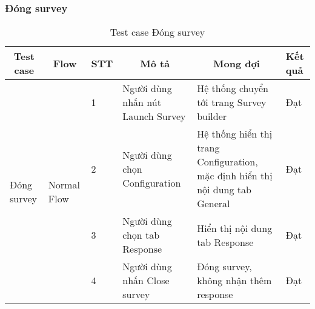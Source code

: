 \subsubsection{Đóng survey}
\begin{table}[H]
\begin{tabular}{|p{2cm}|p{2.5cm}|p{0.5cm}|p{4cm}|p{4cm}|p{1cm}|}
\hline
\multicolumn{1}{|c|}{\textbf{Test case}} & \multicolumn{1}{c|}{\textbf{Flow}} & \textbf{STT} & \multicolumn{1}{c|}{\textbf{Mô tả}} & \multicolumn{1}{c|}{\textbf{Mong đợi}} & \textbf{Kết quả} \\ \hline
\multirow{4}{*}{Đóng survey} & \multirow{4}{*}{Normal Flow} & 1 & Người dùng nhấn nút Launch Survey & Hệ thống chuyển tới trang Survey builder & Đạt \\ \cline{3-6} 
 &  & 2 & Người dùng chọn Configuration & Hệ thống hiển thị trang Configuration, mặc định hiển thị nội dung tab General & Đạt \\ \cline{3-6} 
 &  & 3 & Người dùng chọn tab Response & Hiển thị nội dung tab Response & Đạt \\ \cline{3-6} 
 &  & 4 & Người dùng nhấn Close survey & Đóng survey, không nhận thêm response & Đạt \\ \hline
\end{tabular}
\caption{Test case Đóng survey}
\end{table}